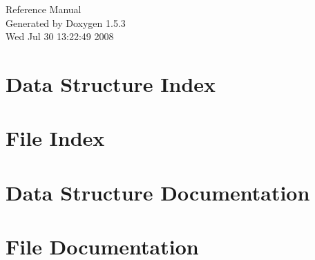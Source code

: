 \documentclass[a4paper]{book}
\begin{document}
\begin{titlepage}
\vspace*{7cm}
\begin{center}
{\Large Reference Manual}\\
\vspace*{1cm}
{\large Generated by Doxygen 1.5.3}\\
\vspace*{0.5cm}
{\small Wed Jul 30 13:22:49 2008}\\
\end{center}
\end{titlepage}
\clearemptydoublepage
{}
\tableofcontents
\clearemptydoublepage
{}
\chapter{Data Structure Index}

\chapter{File Index}

\chapter{Data Structure Documentation}





\chapter{File Documentation}





\printindex
\end{document}
